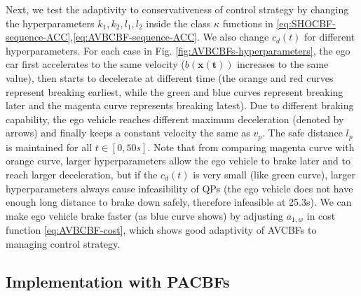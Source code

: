 Next, we test the adaptivity to conservativeness of control strategy by changing the hyperparameters $k_{1},k_{2},l_{1},l_{2}$ inside the class $\kappa$ functions in \eqref{eq:SHOCBF-sequence-ACC},\eqref{eq:AVBCBF-sequence-ACC}. We also change $c_{d}(t)$ for different hyperparameters. For each case in Fig. \ref{fig:AVBCBFs-hyperparameters}, the ego car first accelerates to the same velocity ($b(\boldsymbol{x(t)})$ increases to the same value), then starts to decelerate at different time (the orange and red curves represent breaking earliest, while the green and blue curves represent breaking later and the magenta curve represents breaking latest). Due to different braking capability, the ego vehicle reaches different maximum deceleration (denoted by arrows) and finally keeps a constant velocity the same as $v_{p}$. The safe distance $l_{p}$ is maintained for all $t\in[0,50s].$ Note that from comparing magenta curve with orange curve, larger hyperparameters allow the ego vehicle to brake later and to reach larger deceleration, but if the $c_{d}(t)$ is very small (like green curve), larger hyperparameters always cause infeasibility of QPs (the ego vehicle does not have enough long distance to brake down safely, therefore infeasible at 25.3s). We can make ego vehicle brake faster (as blue curve shows) by adjusting $a_{1,w}$ in cost function \eqref{eq:AVBCBF-cost}, which shows good adaptivity of AVCBFs to managing control strategy.

\subsection{Implementation with PACBFs}

